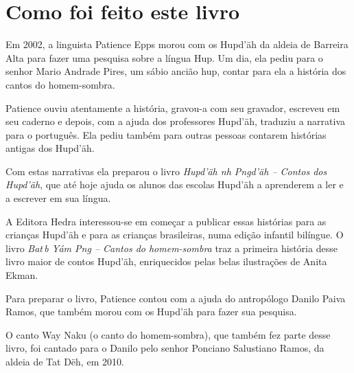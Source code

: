\chapter{Como foi feito este livro}

Em 2002, a linguista Patience Epps morou com os Hupd’äh da aldeia de Barreira Alta para fazer uma pesquisa sobre a língua Hup. Um dia, ela pediu para o senhor Mario Andrade Pires, um sábio ancião hup, contar para ela a história dos cantos do homem-sombra.

Patience ouviu atentamente a história, gravou-a com seu gravador, escreveu em seu caderno e depois, com a ajuda dos professores Hupd’äh, traduziu a narrativa para o português. Ela pediu também para outras pessoas contarem histórias antigas dos Hupd’äh.

Com estas narrativas ela preparou o livro \textit{Hupd’äh n\ii{}h P\ii{}n\II{}gd’äh -- Contos
dos Hupd’äh}, que até hoje ajuda os alunos das escolas Hupd’äh a aprenderem a ler e a escrever em sua língua.

A Editora Hedra interessou-se em começar a publicar essas histórias para as crianças Hupd’äh e para as crianças brasileiras, numa edição infantil bilíngue. O livro \textit{Bat\II{}\,b Yám P\ii n\II g -- Cantos do homem-sombra} traz a primeira história desse livro maior de contos
Hupd’äh, enriquecidos pelas belas ilustrações de Anita Ekman.

Para preparar o livro, Patience contou com a ajuda do antropólogo Danilo Paiva Ramos, que também morou com os Hupd’äh para fazer sua pesquisa.

O canto Way Naku (o canto do homem-sombra), que também fez parte desse livro, foi cantado
para o Danilo pelo senhor Ponciano Salustiano Ramos, da aldeia de Tat Dëh, em 2010.


